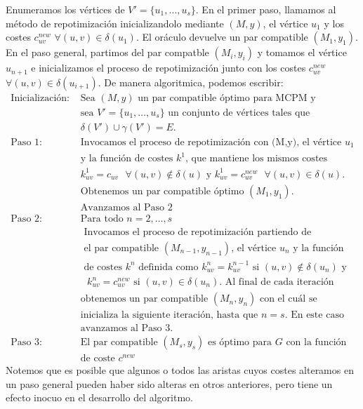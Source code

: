 \documentclass[twoside,a4paper,openright,12pt,tikz]{book}
\begin{document}
Enumeramos los vértices de $V' = \{u_1,\dotsc,u_s\}$. En el primer paso, llamamos al método de repotimización inicializandolo mediante $(M,y)$, el vértice $u_1$ y los costes $c_{uv}^{new}$ $\forall (u,v) \in \delta(u_1)$. El oráculo devuelve un par compatible $(M_1,y_1)$. En el paso general, partimos del par compatble $(M_i,y_i)$ y tomamos el vértice $u_{n+1}$ e inicializamos el proceso de repotimización junto con los costes $c_{uv}^{new}$ $\forall (u,v) \in \delta(u_{i+1})$. 
De manera algoritmica, podemos escribir:
\begin{align*}
\text{Inicialización: }& \text{Sea $(M,y)$ un par compatible óptimo para MCPM y}\\
& \text{sea $V'=\{u_1,\dotsc,u_s\}$ un conjunto de vértices tales que }\\
& \text{$\delta(V')\cup\gamma(V')=E$.}\\
\text{Paso 1: }& \text{Invocamos el proceso de repotimización con (M,y), el vértice $u_1$}\\
&\text{y la función de costes $k^1$, que mantiene los mismos costes}\\
&\text{$k^1_{uv} = c_{uv}$ $\forall (u,v)\notin \delta(u)$ y $k^1_{uv}=c^{new}_{uv}$ $\forall(u,v) \in \delta(u)$.}\\
&\text{Obtenemos un par compatible óptimo $(M_1,y_1)$.}\\
&\text{Avanzamos al Paso 2}\\
\text{Paso 2: }& \text{Para todo $n =2,\dotsc,s$}\\
&\text{		Invocamos el proceso de repotimización partiendo de}\\
&\text{		el par compatible $(M_{n-1},y_{n-1})$, el vértice $u_n$ y la función}\\
&\text{		de costes $k^n$ definida como $k^n_{uv} =k^{n-1}_{uv}$ si $(u,v)\notin \delta(u_n)$ y}\\
&\text{		$k^n_{uv}=c^{new}_{uv}$ si $(u,v)\in \delta(u_n)$. Al final de cada iteración }\\
&\text{obtenemos un par compatible $(M_n,y_n)$ con el cuál se}\\
&\text{inicializa la siguiente iteración, hasta que $n=s$. En este caso}\\
&\text{avanzamos al Paso 3.}\\
\text{Paso 3: }&\text{El par compatible $(M_s,y_s)$ es óptimo para $G$ con la función}\\
&\text{de coste $c^{new}$}
\end{align*}
Notemos que es posible que algunos o todos las aristas cuyos costes alteramos en un paso general pueden haber sido alteras en otros anteriores, pero tiene un efecto inocuo en el desarrollo del algoritmo. 
\end{document}
